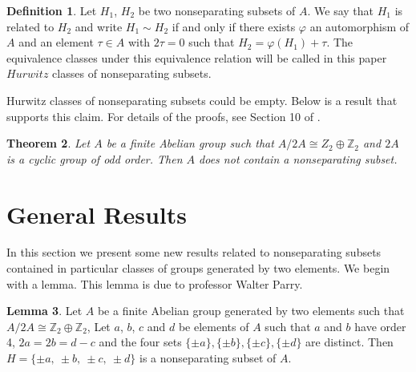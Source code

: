 \documentclass[article,dvisp]{amsart}
\def\Z{\mathbb{Z}}
\newtheorem{thm}{Theorem}[section]
\theoremstyle{definition}
\newtheorem{defn}[thm]{Definition}
\newtheorem{lem}[thm]{Lemma}
\theoremstyle{remark}
\numberwithin{equation}{section}
\theoremstyle{lemma}
\begin{document}
\begin{defn}\label{def:90} Let $H_{1}$, $H_{2}$ be two nonseparating subsets of $A$. We say that $H_{1}$ is related to $H_{2}$ and write $H_{1}\sim H_{2}$ if and only if there exists $\varphi$ an automorphism of $A$ and an element $\tau\in A$ with $2\tau=0$ such that $H_2 = \varphi(H_1)+\tau$. The equivalence classes under this equivalence relation will be called in this paper $Hurwitz$ classes of nonseparating subsets.\end{defn}

Hurwitz classes of nonseparating subsets could be empty. Below is a result that supports this claim. For details of the proofs, see Section 10 of \cite{CFPP}.
\begin{thm}\label{thm:21} Let $A$ be a finite Abelian group such that $A/2A\cong Z_{2}\oplus\Z_{2}$ and $2A$ is a cyclic group of odd order. Then $A$ does not contain a nonseparating subset.
\end{thm}
\newpage
\section{General Results}

In this section we present some new results related to nonseparating subsets contained in particular classes of groups generated by two elements. We begin with a lemma. This lemma is due to professor Walter Parry. 

\begin{lem}\label{lem:60} Let $A$ be a finite Abelian group generated by two elements such that $A/2A \cong\Z_{2}\oplus \Z_{2}$, Let $a$, $b$, $c$ and $d$ be elements of $A$ such that $a$ and $b$ have order 4, $2a=2b=d-c$ and the four sets $\{\pm a\}, \{\pm b\}, \{\pm c\}, \{\pm d\}$ are distinct. Then $H=\{\pm a,\ \pm b,\ \pm c ,\ \pm d \}$ is a nonseparating subset of $A$.\end{lem} 
\end{document}
